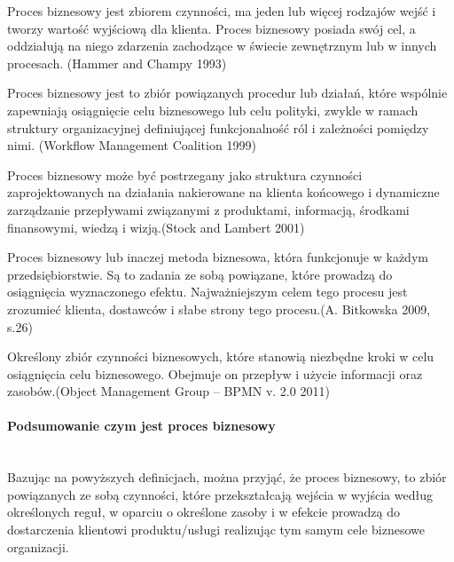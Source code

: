 \documentclass[a4paper, 12pt]{article}
\begin{document}
\hspace*{1.5 cm}Proces biznesowy jest zbiorem czynności, ma jeden lub więcej rodzajów wejść i tworzy wartość wyjściową dla klienta. Proces biznesowy posiada swój cel, a oddziałują na niego zdarzenia zachodzące w świecie zewnętrznym lub w innych procesach.
(Hammer and Champy 1993)

\hspace*{1.5 cm} Proces biznesowy jest to zbiór powiązanych procedur lub działań, które wspólnie zapewniają osiągnięcie celu biznesowego lub celu polityki, zwykle w ramach struktury organizacyjnej definiującej funkcjonalność ról i zależności pomiędzy nimi. (Workflow Management Coalition 1999) 

\hspace*{1.5 cm}Proces biznesowy może być postrzegany jako struktura czynności zaprojektowanych na działania nakierowane na klienta końcowego i dynamiczne zarządzanie przepływami związanymi z produktami, informacją, środkami finansowymi, wiedzą i wizją.(Stock and Lambert 2001)        

\hspace*{1.5 cm}Proces biznesowy lub inaczej metoda biznesowa, która funkcjonuje w każdym przedsiębiorstwie. Są to zadania ze sobą powiązane, które prowadzą do osiągnięcia wyznaczonego efektu. Najważniejszym celem tego procesu jest zrozumieć klienta, dostawców i słabe strony tego procesu.(A. Bitkowska 2009, s.26)

\hspace*{1.5 cm}Określony zbiór czynności biznesowych, które stanowią niezbędne kroki w celu osiągnięcia celu biznesowego. Obejmuje on przepływ i użycie informacji oraz zasobów.(Object Management Group – BPMN v. 2.0 2011) 
\paragraph{Podsumowanie czym jest proces biznesowy}\mbox{}\\
\hspace{1.5 cm} Bazując na powyższych definicjach, można przyjąć, że proces biznesowy, to zbiór powiązanych ze sobą czynności, które przekształcają wejścia w wyjścia według określonych reguł, w oparciu o określone zasoby i w efekcie prowadzą do dostarczenia klientowi produktu/usługi realizując tym samym cele biznesowe organizacji.
\end{document}
